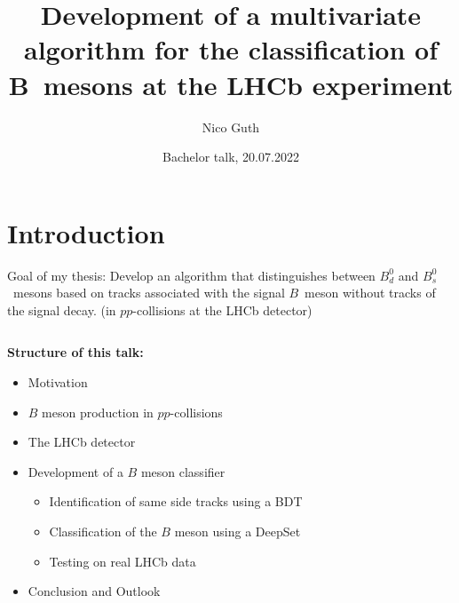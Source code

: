\documentclass[aspectratio=1610, 10pt]{beamer}
\title{Development of a multivariate algorithm for the classification of B~mesons at the LHCb experiment}
\author[N.~Guth]{Nico Guth}
\institute[AG Albrecht]{Arbeitsgruppe Albrecht \\ Fakultät Physik}
\date{Bachelor talk, 20.07.2022}
\begin{document}
\maketitle

\section*{Introduction}

\begin{frame}
  \begin{block}{Goal of my thesis:}
    Develop an algorithm that distinguishes between $B^0_d$ and $B^0_s$~mesons based on tracks associated with the signal $B$~meson without tracks of the signal decay. (in $pp$-collisions at the LHCb detector) 
  \end{block}

  \pause
  \medskip
  \centering
  \begin{columns}
    \begin{column}{0.6\textwidth}
      \textbf{Structure of this talk:}
        \begin{itemize}
          \item Motivation
          \item $B$ meson production in $pp$-collisions
          \item The LHCb detector
          \item Development of a $B$ meson classifier
          \begin{itemize}
            \item Identification of same side tracks using a BDT
            \item Classification of the $B$ meson using a DeepSet
            \item Testing on real LHCb data
          \end{itemize}
          \item Conclusion and Outlook
        \end{itemize}
    \end{column}
  \end{columns}
\end{frame}
\end{document}
